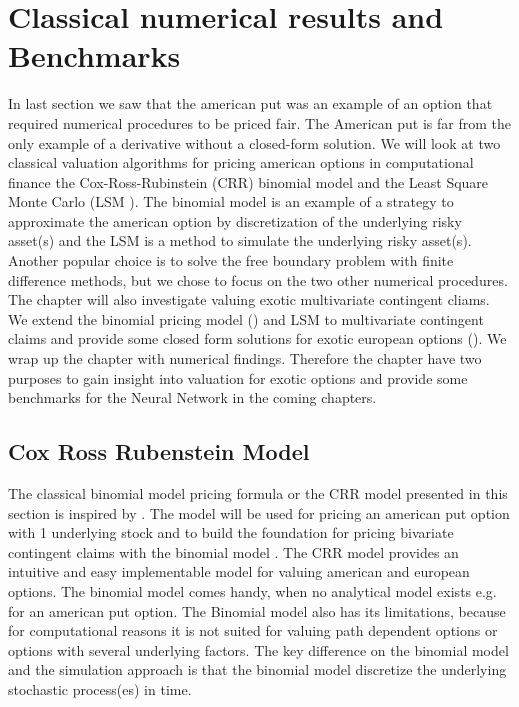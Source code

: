 
\chapter{Classical numerical results and Benchmarks} %

\label{Chapter3} %

In last section we saw that the american put was an example of an option that required numerical procedures to be priced fair. The American put is far from the only example of a derivative without a closed-form solution. We will look at two classical valuation algorithms for pricing american options in computational finance the Cox-Ross-Rubinstein (CRR) binomial model \parencite{CRR} and the Least Square Monte Carlo (LSM \parencite{lsm}). The binomial model is an example of a strategy to approximate the american option by discretization of the underlying risky asset(s) and the LSM is a method to simulate the underlying risky asset(s). Another popular choice is to solve the free boundary problem with finite difference methods, but we chose to focus on the two other numerical procedures. The chapter will also investigate valuing exotic multivariate contingent cliams. We extend the binomial pricing model (\parencite{NEK,BEG}) and LSM to multivariate contingent claims and provide some closed form solutions for exotic european options (\parencite{Johnson87, Ouwehand2006}). We wrap up the chapter with numerical findings. Therefore the chapter have two purposes to gain insight into valuation for exotic options and provide some benchmarks for the Neural Network in the coming chapters.

\section{Cox Ross Rubenstein Model}\label{CRR}
The classical binomial model pricing formula or the CRR model presented in this section is inspired by \parencite{CRR,Hull,finKont}. The model will be used for pricing an american put option with 1 underlying stock and to build the foundation for pricing bivariate contingent claims with the binomial model \parencite{BEG}. The CRR model provides an intuitive and easy implementable model for valuing american and european options. The binomial model comes handy, when no analytical model exists e.g. for an american put option. The Binomial model also has its limitations, because for computational reasons it is not suited for valuing path dependent options or options with several underlying factors. The key difference on the binomial model and the simulation approach is that the binomial model discretize the underlying stochastic process(es) in time. \\


